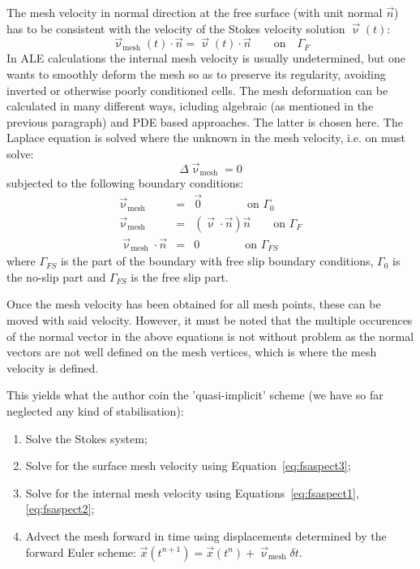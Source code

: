 The mesh velocity in normal direction at the free surface (with
unit normal $\vec{n}$) has to be consistent with the velocity of the Stokes
velocity solution $\vec{\upnu}(t)$:
\begin{equation}
\vec{\upnu}_{\text{mesh}}(t)\cdot \vec{n} = \vec{\upnu}(t)\cdot \vec{n} 
\qquad
\text{on}
\quad
\Gamma_F
\end{equation}
In ALE calculations the internal mesh velocity is usually undetermined, 
but one wants to smoothly deform the mesh so as to preserve its regularity, 
avoiding inverted or otherwise poorly conditioned cells. 
The mesh deformation can be calculated in many different ways, icluding algebraic 
(as mentioned in the previous paragraph) and PDE based approaches.
The latter is chosen here. 
The Laplace equation is solved where the unknown in the mesh velocity, i.e. 
on must solve:
\begin{equation}
\Delta \vec{\upnu}_{\text{mesh}} = 0\label{eq:fsaspect1}
\end{equation}
subjected to the following boundary conditions:
\begin{eqnarray}
\vec{\upnu}_{\text{mesh}} &=& \vec{0} \qquad\qquad \text{on } \Gamma_0 \\
\vec{\upnu}_{\text{mesh}} &=& (\vec{\upnu}\cdot\vec{n})\vec{n} \qquad \text{on } \Gamma_F \\
\vec{\upnu}_{\text{mesh}}\cdot \vec{n} &=& 0 \qquad\qquad \text{on } \Gamma_{FS} \label{eq:fsaspect2}
\end{eqnarray}
where $\Gamma_{FS}$ is the part of the boundary with free slip boundary conditions, 
$\Gamma_0$ is the no-slip part and $\Gamma_{FS}$ is the free slip part.

Once the mesh velocity has been obtained for all mesh points, these can be moved with 
said velocity. However, it must be noted that the multiple occurences of the normal vector
in the above equations is not without problem as the normal vectors are not well defined on the
mesh vertices, which is where the mesh velocity is defined.

This yields what the author coin the 'quasi-implicit' scheme 
(we have so far neglected any kind of stabilisation):
\begin{enumerate}
\item Solve the Stokes system;
\item Solve for the surface mesh velocity using Equation~\ref{eq:fsaspect3};
\item Solve for the internal mesh velocity using Equations~\ref{eq:fsaspect1}, \ref{eq:fsaspect2}; 
\item Advect the mesh forward in time using displacements determined by
the forward Euler scheme: $\vec{x}(t^{n+1} ) = \vec{x}(t^n ) + \vec{\upnu}_{\text{mesh}} \delta t$.
\end{enumerate}

